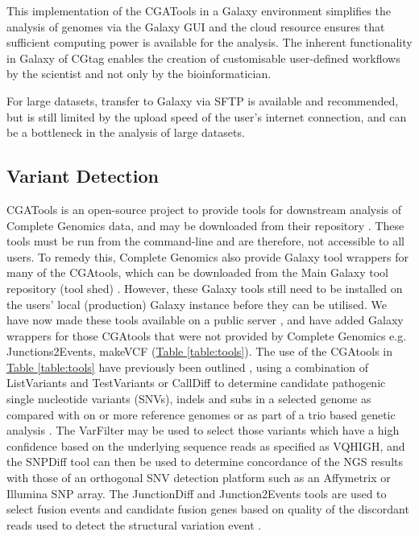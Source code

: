 This implementation of the CGATools in a Galaxy environment simplifies the analysis of genomes via the Galaxy GUI and the cloud resource ensures that sufficient computing power is available for the analysis. The inherent functionality in Galaxy of CGtag enables the creation of customisable user-defined workflows by the scientist and not only by the bioinformatician.

For large datasets, transfer to Galaxy via SFTP is available and recommended, but is still limited by the upload speed of the user’s internet connection, and can be a bottleneck in the analysis of large datasets.


\subsection*{Variant Detection}

CGATools is an open-source project to provide tools for downstream analysis of Complete Genomics data, and may be downloaded from their repository \cite{url-cgatools}. These tools must be run from the command-line and are therefore, not accessible to all users. To remedy this, Complete Genomics also provide Galaxy tool wrappers for many of the CGAtools, which can be downloaded from the Main Galaxy tool repository (tool shed) \cite{url-toolshed}. However, these Galaxy tools still need to be installed on the users’ local (production) Galaxy instance before they can be utilised. We have now made these tools available on a public server \cite{url-nbicgalaxy}, and have added Galaxy wrappers for those CGAtools that were not provided by Complete Genomics e.g. Junctions2Events, makeVCF (\hyperref[table:tools]{Table \ref{table:tools}}). The use of the CGAtools in \hyperref[table:tools]{Table \ref{table:tools}} have previously been outlined \cite{nieminen}, using a combination of ListVariants and TestVariants or CallDiff to determine candidate pathogenic single nucleotide variants (SNVs), indels and subs in a selected genome as compared with on or more reference genomes or as part of a trio based genetic analysis \cite{nieminen}. The VarFilter may be used to select those variants which have a high confidence based on the underlying sequence reads as specified as VQHIGH, and the SNPDiff tool can then be used to determine concordance of the NGS results with those of an orthogonal SNV detection platform such as an Affymetrix or Illumina SNP array. The JunctionDiff and Junction2Events tools are used to select fusion events and candidate fusion genes based on quality of the discordant reads used to detect the structural variation event \cite{ifuse}.


